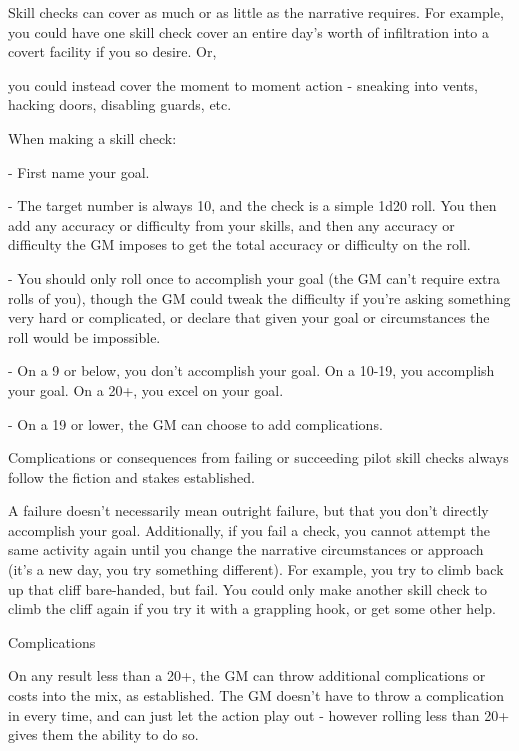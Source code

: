 Skill checks can cover as much or as little as the narrative requires. For example, you could have
one skill check cover an entire day’s worth of infiltration into a covert facility if you so desire. Or,




you could instead cover the moment to moment action - sneaking into vents, hacking doors,
disabling guards, etc.

When making a skill check:

    -    First name your goal.

    -    The target number is always 10, and the check is a simple 1d20 roll. You then add any
         accuracy or difficulty from your skills, and then any accuracy or difficulty the GM imposes
         to get the total accuracy or difficulty on the roll.

    -    You should only roll once to accomplish your goal (the GM can’t require extra rolls of
         you), though the GM could tweak the difficulty if you’re asking something very hard or
         complicated, or declare that given your goal or circumstances the roll would be
         impossible.

    -    On a 9 or below, you don’t accomplish your goal. On a 10-19, you accomplish your goal.
         On a 20+, you excel on your goal.

    -    On a 19 or lower, the GM can choose to add complications.


Complications or consequences from failing or succeeding pilot skill checks always follow the
fiction and stakes established.


A failure doesn’t necessarily mean outright failure, but that you don’t directly accomplish your
goal. Additionally, if you fail a check, you cannot attempt the same activity again until you change
the narrative circumstances or approach (it’s a new day, you try something different). For
example, you try to climb back up that cliff bare-handed, but fail. You could only make another
skill check to climb the cliff again if you try it with a grappling hook, or get some other help.


                                                 Complications

On any result less than a 20+, the GM can throw additional complications or costs into the mix,
as established. The GM doesn’t have to throw a complication in every time, and can just let the
action play out - however rolling less than 20+ gives them the ability to do so.


